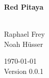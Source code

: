\documentclass[a4paper,oneside]{alpenthesis/alpenthesis}
\begin{document}
\begin{titlingpage}
    \flushright\sffamily

    \vspace*{5em}
    \Huge\bfseries{Red Pitaya}\\[1ex]
    \Large{}\\[3ex]

    \normalsize\mdseries
    
    \vfill
    Raphael Frey\\
    Noah H\"usser\\[3ex]

    \vspace{5em}

    \today\\
    Version 0.0.1
\end{titlingpage} %

\frontmatter
\tableofcontents*
\clearpage
\listoffigures*
\clearpage
\listoftables*
\clearpage
\listoflistings
\clearpage

\mainmatter



\end{document}
